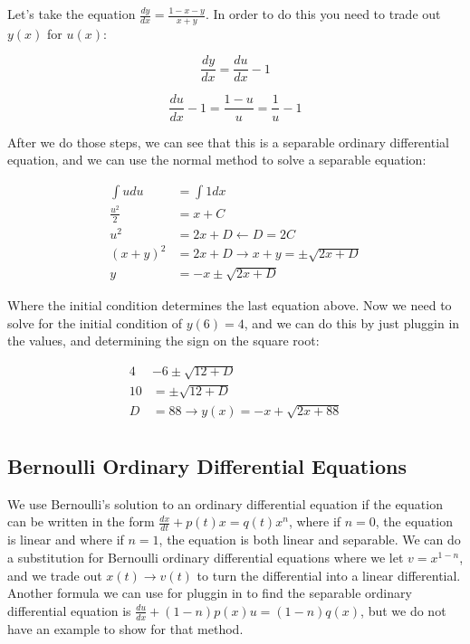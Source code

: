     \begin{problem}
      Let's take the equation $\frac{dy}{dx}=\frac{1-x-y}{x+y}$. In order to do this you need to trade out $y(x)$ for $u(x)$:

      \begin{equation}
        \frac{dy}{dx}=\frac{du}{dx}-1
      \end{equation}

      \begin{equation}
        \frac{du}{dx}-1=\frac{1-u}{u}=\frac{1}{u}-1
      \end{equation}

      After we do those steps, we can see that this is a separable ordinary differential equation, and we can use the normal method to solve a separable equation:

      \begin{equation}
        \begin{aligned}
          \int udu&=\int1dx\\
          \frac{u^2}{2}&=x+C\\
          u^2&=2x+D\leftarrow D=2C\\
          (x+y)^2&=2x+D\rightarrow x+y=\pm\sqrt{2x+D}\\
          y&=-x\pm\sqrt{2x+D}
        \end{aligned}
      \end{equation}

      Where the initial condition determines the last equation above. Now we need to solve for the initial condition of $y(6)=4$, and we can do this by just pluggin in the values, and determining the sign on the square root:

      \begin{equation}
        \begin{aligned}
           4&-6\pm\sqrt{12+D}\\
          10&=\pm\sqrt{12+D}\\
          D&=88\to y(x)=-x+\sqrt{2x+88}\\
        \end{aligned}
      \end{equation}
    \end{problem}

  \subsection{Bernoulli Ordinary Differential Equations}

    We use Bernoulli's solution to an ordinary differential equation if the equation can be written in the form $\frac{dx}{dt}+p(t)x=q(t)x^n$, where if $n=0$, the equation is linear and where if $n=1$, the equation is both linear and separable. We can do a substitution for Bernoulli ordinary differential equations where we let $v=x^{1-n}$, and we trade out $x(t)\to v(t)$ to turn the differential into a linear differential. Another formula we can use for pluggin in to find the separable ordinary differential equation is $\frac{du}{dx}+(1-n)p(x)u=(1-n)q(x)$, but we do not have an example to show for that method. 

